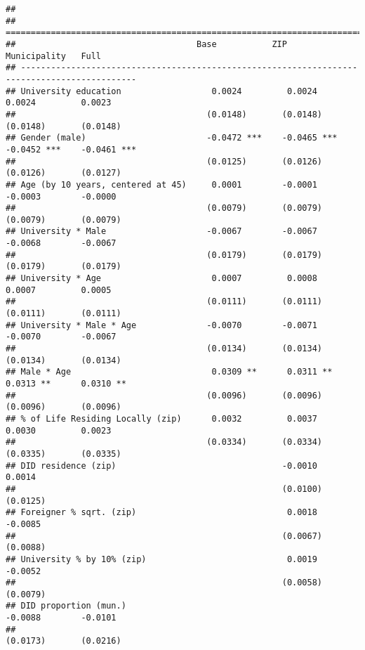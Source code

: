 \documentclass[
]{article}
\begin{document}
\begin{verbatim}
## 
## =============================================================================================
##                                    Base           ZIP            Municipality   Full         
## ---------------------------------------------------------------------------------------------
## University education                  0.0024         0.0024         0.0024         0.0023    
##                                      (0.0148)       (0.0148)       (0.0148)       (0.0148)   
## Gender (male)                        -0.0472 ***    -0.0465 ***    -0.0452 ***    -0.0461 ***
##                                      (0.0125)       (0.0126)       (0.0126)       (0.0127)   
## Age (by 10 years, centered at 45)     0.0001        -0.0001        -0.0003        -0.0000    
##                                      (0.0079)       (0.0079)       (0.0079)       (0.0079)   
## University * Male                    -0.0067        -0.0067        -0.0068        -0.0067    
##                                      (0.0179)       (0.0179)       (0.0179)       (0.0179)   
## University * Age                      0.0007         0.0008         0.0007         0.0005    
##                                      (0.0111)       (0.0111)       (0.0111)       (0.0111)   
## University * Male * Age              -0.0070        -0.0071        -0.0070        -0.0067    
##                                      (0.0134)       (0.0134)       (0.0134)       (0.0134)   
## Male * Age                            0.0309 **      0.0311 **      0.0313 **      0.0310 ** 
##                                      (0.0096)       (0.0096)       (0.0096)       (0.0096)   
## % of Life Residing Locally (zip)      0.0032         0.0037         0.0030         0.0023    
##                                      (0.0334)       (0.0334)       (0.0335)       (0.0335)   
## DID residence (zip)                                 -0.0010                        0.0014    
##                                                     (0.0100)                      (0.0125)   
## Foreigner % sqrt. (zip)                              0.0018                       -0.0085    
##                                                     (0.0067)                      (0.0088)   
## University % by 10% (zip)                            0.0019                       -0.0052    
##                                                     (0.0058)                      (0.0079)   
## DID proportion (mun.)                                              -0.0088        -0.0101    
##                                                                    (0.0173)       (0.0216)   

\end{verbatim}
\end{document}
